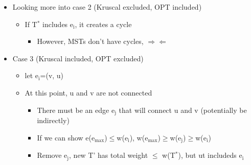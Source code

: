 \documentclass[11pt]{article}
\begin{document}
\begin{itemize}
\begin{itemize}
\begin{itemize}
\begin{itemize}
\begin{center}
\end{center}
\item Looking more into case 2 (Kruscal excluded, OPT included)
\begin{itemize}
\item If T\(^{\text{*}}\) includes e\(_{\text{i}}\), it creates a cycle
\begin{itemize}
\item However, MSTs don't have cycles, \(\Rightarrow \Leftarrow\)
\end{itemize}
\end{itemize}
\item Case 3 (Kruscal included, OPT excluded)
\begin{itemize}
\item let e\(_{\text{i}}\)=(v, u)
\item At this point, u and v are not connected
\begin{itemize}
\item There must be an edge e\(_{\text{j}}\) that will connect u and v (potentially be indirectly)
\item If we can show e(e\(_{\text{max}}\))\(\le\)w(e\(_{\text{i}}\)), w(e\(_{\text{max}}\))\(\ge\)w(e\(_{\text{j}}\))\(\ge\)w(e\(_{\text{i}}\))
\item Remove e\(_{\text{j}}\), new T' has total weight \(\le\) w(T\(^{\text{*}}\)), but ut includeds e\(_{\text{i}}\)
\end{itemize}
\end{itemize}
\end{itemize}
\end{itemize}
\end{itemize}
\begin{center}

\end{center}
\end{itemize}
\end{document}

